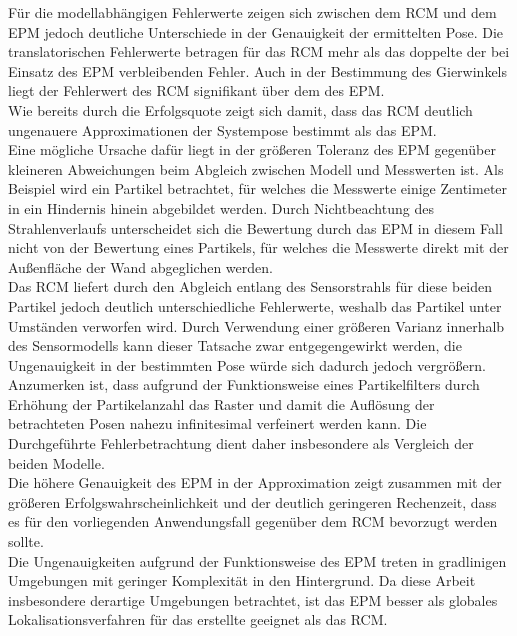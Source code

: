 Für die modellabhängigen Fehlerwerte zeigen sich zwischen dem RCM und dem EPM jedoch deutliche Unterschiede in der Genauigkeit der ermittelten Pose. Die translatorischen Fehlerwerte betragen für das RCM mehr als das doppelte der bei Einsatz des EPM verbleibenden Fehler. Auch in der Bestimmung des Gierwinkels liegt der Fehlerwert des RCM signifikant über dem des EPM.\\
Wie bereits durch die Erfolgsquote zeigt sich damit, dass das RCM deutlich ungenauere Approximationen der Systempose bestimmt als das EPM.\\

Eine mögliche Ursache dafür liegt in der größeren Toleranz des EPM gegenüber kleineren Abweichungen beim Abgleich zwischen Modell und Messwerten ist. Als Beispiel wird ein Partikel betrachtet, für welches die Messwerte einige Zentimeter in ein Hindernis hinein abgebildet werden. Durch Nichtbeachtung des Strahlenverlaufs unterscheidet sich die Bewertung durch das EPM in diesem Fall nicht von der Bewertung eines Partikels, für welches die Messwerte direkt mit der Außenfläche der Wand abgeglichen werden.\\
Das RCM liefert durch den Abgleich entlang des Sensorstrahls für diese beiden Partikel jedoch deutlich unterschiedliche Fehlerwerte, weshalb das Partikel unter Umständen verworfen wird. Durch Verwendung einer größeren Varianz innerhalb des Sensormodells kann dieser Tatsache zwar entgegengewirkt werden, die Ungenauigkeit in der bestimmten Pose würde sich dadurch jedoch vergrößern.\\

Anzumerken ist, dass aufgrund der Funktionsweise eines Partikelfilters durch Erhöhung der Partikelanzahl das Raster und damit die Auflösung der betrachteten Posen nahezu infinitesimal verfeinert werden kann. Die Durchgeführte Fehlerbetrachtung dient daher insbesondere als Vergleich der beiden Modelle.\\
Die höhere Genauigkeit des EPM in der Approximation zeigt zusammen mit der größeren Erfolgswahrscheinlichkeit und der deutlich geringeren Rechenzeit, dass es für den vorliegenden Anwendungsfall gegenüber dem RCM bevorzugt werden sollte.\\
Die Ungenauigkeiten aufgrund der Funktionsweise des EPM treten in gradlinigen Umgebungen mit geringer Komplexität in den Hintergrund. Da diese Arbeit insbesondere derartige Umgebungen betrachtet, ist das EPM besser als globales Lokalisationsverfahren für das erstellte \kps{} geeignet als das RCM.\\

